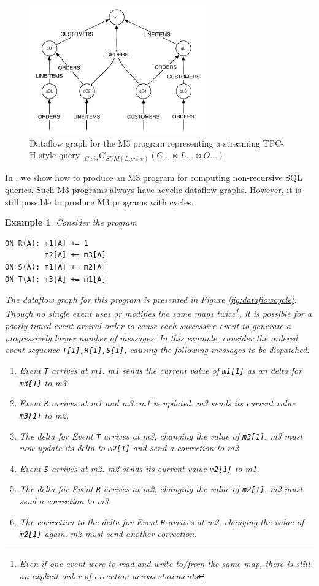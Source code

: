 \documentclass{vldb}
\newtheorem{example}[theorem]{Example}
\begin{document}
\begin{figure}
\begin{center}
\includegraphics[width=3in]{graphics/q12_graph}
\end{center}
\caption{Dataflow graph for the M3 program representing a streaming TPC-H-style query $\ _{C.cid}G_{SUM(L.price)}(C\ldots \bowtie L\ldots \bowtie O\ldots)$}
\label{fig:dataflow}
\end{figure}

In \cite{dbtoaster-pods}, we show how to produce an M3 program for computing non-recursive SQL queries.  Such M3 programs always have acyclic dataflow graphs.  However, it is still possible to produce M3 programs with cycles.  

\begin{example}
\label{ex:cyclegraph}
Consider the program
\begin{verbatim}
ON R(A): m1[A] += 1
         m2[A] += m3[A]
ON S(A): m1[A] += m2[A]
ON T(A): m3[A] += m1[A]
\end{verbatim}
The dataflow graph for this program is presented in Figure \ref{fig:dataflowcycle}.  Though no single event uses or modifies the same maps twice\footnote{Even if one event were to read and write to/from the same map, there is still an explicit order of execution across statements}, it is possible for a poorly timed event arrival order to cause each successive event to generate a progressively larger number of messages.  In this example, consider the ordered event sequence \texttt{T[1],R[1],S[1]}, causing the following messages to be dispatched:
\begin{enumerate}
\item Event \texttt{T} arrives at m1.  m1 sends the current value of \texttt{m1[1]} as an delta for \texttt{m3[1]} to m3.
\item Event \texttt{R} arrives at m1 and m3.  m1 is updated.  m3 sends its current value \texttt{m3[1]} to m2.  
\item The delta for Event \texttt{T} arrives at m3, changing the value of \texttt{m3[1]}.  m3 must now update its delta to \texttt{m2[1]} and send a correction to m2.
\item Event \texttt{S} arrives at m2.  m2 sends its current value \texttt{m2[1]} to m1.  
\item The delta for Event \texttt{R} arrives at m2, changing the value of \texttt{m2[1]}.  m2 must send a correction to m3.
\item The correction to the delta for Event \texttt{R} arrives at m2, changing the value of \texttt{m2[1]} again.  m2 must send another correction.
\end{enumerate}
\end{example}
\end{document}
